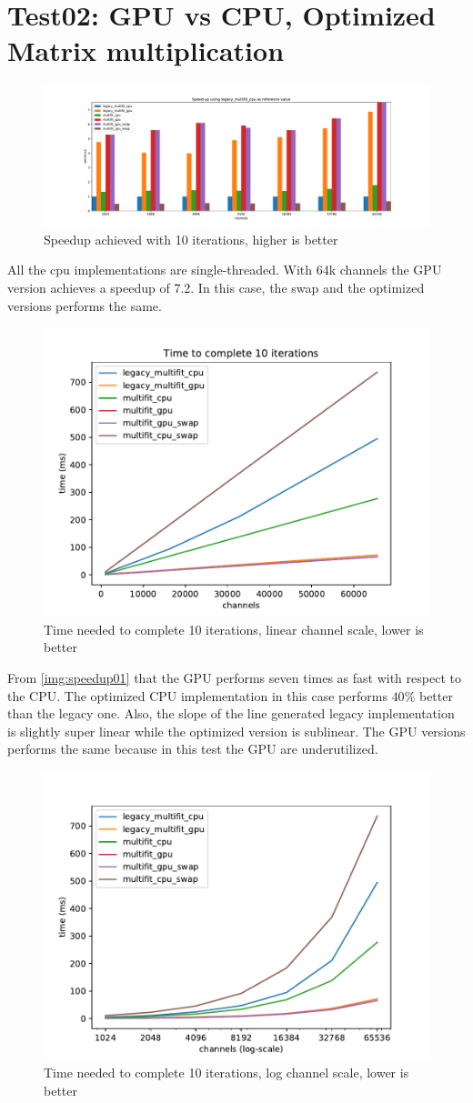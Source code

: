 \section{Test02: GPU vs CPU, Optimized Matrix multiplication}

\begin{figure}[h]
  \includegraphics[width=\textwidth]{img/speedup02}
  \caption{Speedup achieved with 10 iterations, higher is better}
  \label{img:speedup02}
\end{figure}
All the cpu implementations are single-threaded. With 64k channels the GPU version achieves a speedup of 7.2. In this case, the swap and the optimized versions performs the same.
\begin{figure}[H]
  \includegraphics[width=.75\textwidth]{img/linscale02}
  \caption{Time needed to complete 10 iterations, linear channel scale, lower is better}
  \label{img:linscale02}
\end{figure}
From \ref{img:speedup01} that the GPU performs seven times as fast with respect to the CPU. The optimized CPU implementation in this case performs $40\%$ better than the legacy one. Also, the slope of the line generated legacy implementation is slightly super linear while the optimized version is sublinear. The GPU versions performs the same because in this test the GPU are underutilized.
\begin{figure}[H]
  \includegraphics[width=.75\textwidth]{img/logscale02}
  \caption{Time needed to complete 10 iterations, log channel scale, lower is better}
  \label{img:logscale02}
\end{figure}